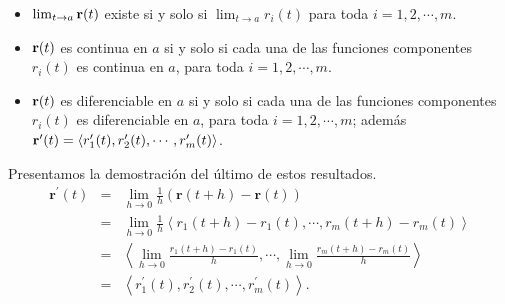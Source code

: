   \begin{itemize}
    \item $\lim_{t\to a}{\bf r}(t)$ existe si y solo si $\lim_{t\to a}r_i(t)$ para toda $i=1,2,\cdots ,m$.
    \item ${\bf r}(t)$ es continua en $a$ si y solo si cada una de las funciones componentes $r_i(t)$ es continua en $a$, para toda $i=1,2,\cdots ,m$.
    \item ${\bf r}(t)$ es diferenciable en $a$ si y solo si cada una de las funciones componentes $r_i(t)$ es diferenciable en $a$, para toda $i=1,2,\cdots ,m$; además ${\bf r}^\prime(t)= \langle r^\prime_1(t),r^\prime_2(t),\cdots, r^\prime_m(t)\rangle$.
  \end{itemize}

  Presentamos la demostración del último de estos resultados.
  \begin{eqnarray*}
    \mathbf{r}^{\prime}(t) &=& \lim_{h\rightarrow 0}\frac{1}{h}\left( \mathbf{r}\left( t+h\right) -\mathbf{r}(t) \right) \\
    &=& \lim_{h\rightarrow 0}\frac{1}{h}\left\langle r_{1}\left(t+h\right) -r_{1}(t) ,\cdots ,r_{m}\left( t+h\right) -r_{m}(t) \right\rangle \\
    &=&\left\langle \lim_{h\rightarrow 0}\frac{r_{1}\left( t+h\right) -r_{1}(t) }{h},\cdots ,\lim_{h\rightarrow 0}\frac{r_{m}\left( t+h\right) -r_{m}(t) }{h}\right\rangle \\
    &=& \left\langle r_{1}^{\prime}(t),r_{2}^{\prime}(t) ,\cdots ,r_{m}^{\prime}\left(t\right) \right\rangle.
  \end{eqnarray*}

